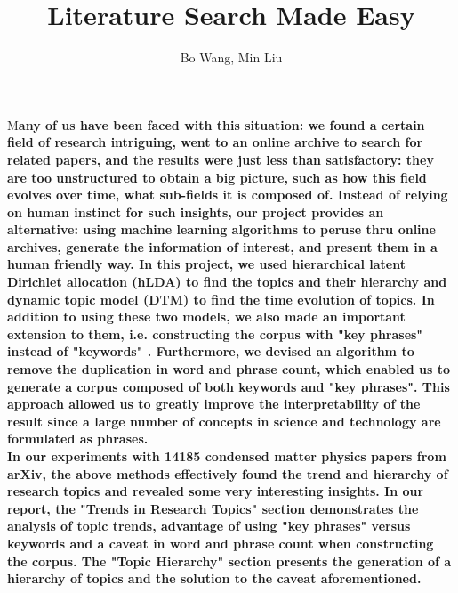 \documentclass[DIV=calc, paper=letter, fontsize=10pt, twocolumn]{scrartcl}	 %
\title{\Huge Literature Search Made Easy} %
\author{Bo Wang, Min Liu } %
\date{} %
\newcommand{\initial}[1]{ %
\lettrine[lines=3,lhang=0.3,nindent=0em]{
\color{DarkGoldenrod}
{\textsf{#1}}}{}}
\begin{document}
\maketitle %

\thispagestyle{fancy} %


\initial{M}\textbf{any of us have been faced with this situation: we found a certain field of research intriguing, went to an online archive to search for related papers, and the results were just less than satisfactory: they are too unstructured to obtain a big picture, such as how this field evolves over time, what sub-fields it is composed of. Instead of relying on human instinct for such insights, our project provides an alternative: using machine learning algorithms to peruse thru online archives, generate the information of interest, and present them in a human friendly way. In this project, we used hierarchical latent Dirichlet allocation (hLDA) to find the topics and their hierarchy and dynamic topic model (DTM) to find the time evolution of topics. In addition to using these two models, we also made an important extension to them, i.e. constructing the corpus with "key phrases" instead of "keywords" . Furthermore, we devised an algorithm to remove the duplication in word and phrase count, which enabled us to generate a corpus composed of both keywords and "key phrases". This approach allowed us to greatly improve the interpretability of the result since a large number of concepts in science and technology are formulated as phrases.\\
In our experiments with 14185 condensed matter physics papers from arXiv, the above methods effectively found the trend and hierarchy of research topics and revealed some very interesting insights. In our report, the "Trends in Research Topics" section demonstrates the analysis of topic trends, advantage of using "key phrases" versus keywords and a caveat in word and phrase count when constructing the corpus. The "Topic Hierarchy" section presents the generation of a hierarchy of topics and the solution to the caveat aforementioned.}
\end{document}

